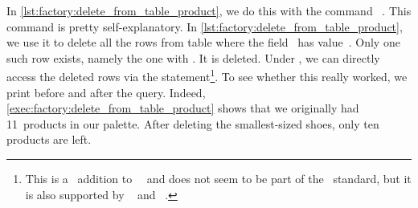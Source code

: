 In \cref{lst:factory:delete_from_table_product}, we do this with the command ~\cite{PGDG:PD:D}.
This command is pretty self-explanatory.%
%
%
%
%
%
%
In \cref{lst:factory:delete_from_table_product}, we use it to delete all the rows from table  where the field~ has value~.
Only one such row exists, namely the one with .
It is deleted.
Under \postgresql, we can directly access the deleted rows via the  statement\footnote{This is a \postgresql\ addition to~\sql~\cite{SE:DA:2020WDSSOAOTNPSDIOR} and does not seem to be part of the \sql\ standard, but it is also supported by \mariadb~\cite{M:MSD:D} and \sqlite~\cite{HWACIS:R}.}.
To see whether this really worked, we print  before and after the  query.
Indeed, \cref{exec:factory:delete_from_table_product} shows that we originally had 11~products in our palette.
After deleting the smallest-sized shoes, only ten products are left.%
%
\endhsection%
\FloatBarrier%
\endhsection%
%
